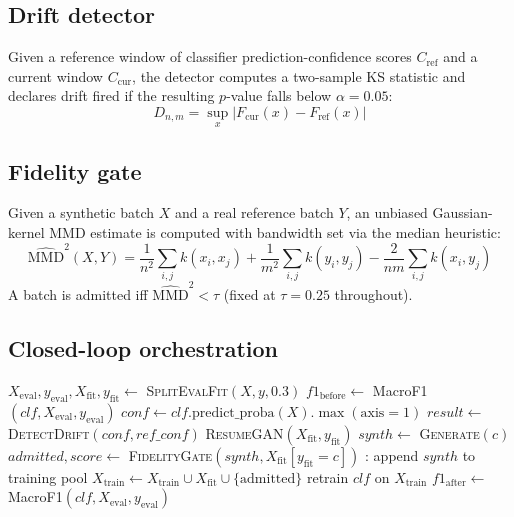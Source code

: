 \documentclass[conference]{IEEEtran}
\begin{document}
\subsection{Drift detector}
Given a reference window of classifier prediction-confidence scores $C_{\text{ref}}$ and a
current window $C_{\text{cur}}$, the detector computes a two-sample KS statistic and declares
drift fired if the resulting $p$-value falls below $\alpha=0.05$:
\begin{equation}
  D_{n,m} = \sup_x \left| F_{\text{cur}}(x) - F_{\text{ref}}(x) \right|
\end{equation}

\subsection{Fidelity gate}
Given a synthetic batch $X$ and a real reference batch $Y$, an unbiased Gaussian-kernel MMD
estimate is computed with bandwidth set via the median heuristic:
\begin{equation}
  \widehat{\text{MMD}}^2(X, Y) = \frac{1}{n^2}\sum_{i,j} k(x_i, x_j) +
  \frac{1}{m^2}\sum_{i,j} k(y_i, y_j) - \frac{2}{nm}\sum_{i,j} k(x_i, y_j)
\end{equation}
A batch is admitted iff $\widehat{\text{MMD}}^2 < \tau$ (fixed at $\tau=0.25$ throughout).

\subsection{Closed-loop orchestration}
\begin{algorithm}
\caption{ClosedLoopOrchestrator.step (post-fix)}
\begin{algorithmic}[1]
\State $X_{\text{eval}}, y_{\text{eval}}, X_{\text{fit}}, y_{\text{fit}} \gets$
  \textsc{SplitEvalFit}$(X, y, 0.3)$
\State $f1_{\text{before}} \gets$ MacroF1$(clf, X_{\text{eval}}, y_{\text{eval}})$
\State $conf \gets clf.\text{predict\_proba}(X).\max(\text{axis}=1)$
\State $result \gets$ \textsc{DetectDrift}$(conf, ref\_conf)$
  \State \textsc{ResumeGAN}$(X_{\text{fit}}, y_{\text{fit}})$
    \State $synth \gets$ \textsc{Generate}$(c)$
    \State $admitted, score \gets$ \textsc{FidelityGate}$(synth, X_{\text{fit}}[y_{\text{fit}}=c])$
    : append $synth$ to training pool \EndIf
  \EndFor
  \State $X_{\text{train}} \gets X_{\text{train}} \cup X_{\text{fit}} \cup \{\text{admitted}\}$
  \State retrain $clf$ on $X_{\text{train}}$
  \State $f1_{\text{after}} \gets$ MacroF1$(clf, X_{\text{eval}}, y_{\text{eval}})$
\EndIf
\end{algorithmic}
\end{algorithm}
\end{document}
